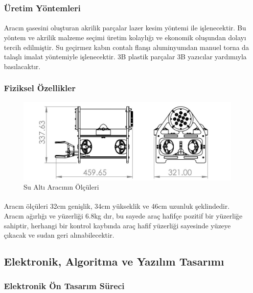 \documentclass[12pt]{article}
\begin{document}
\subsubsection{Üretim Yöntemleri}


\paragraph{} Aracın şasesini oluşturan akrilik parçalar lazer kesim yöntemi ile işlenecektir. Bu yöntem ve akrilik malzeme seçimi üretim kolaylığı ve ekonomik oluşundan dolayı tercih edilmiştir. Su geçirmez kabın contalı flanşı aluminyumdan manuel torna da talaşlı imalat yöntemiyle işlenecektir. 3B plastik parçalar 3B yazıcılar yardımıyla basılacaktır.\newpage

\subsubsection{Fiziksel Özellikler}

\begin{figure}[h]
\centering
\includegraphics[width=1\linewidth]{specs.jpg}
\caption{Su Altı Aracının Ölçüleri}
\end{figure}


\paragraph{} Aracın ölçüleri 32cm genişlik, 34cm yükseklik ve 46cm uzunluk şeklindedir. Aracın ağırlığı ve yüzerliği 6.8kg dır, bu sayede araç hafifçe pozitif bir yüzerliğe sahiptir, herhangi bir kontrol kaybında araç hafif yüzerliği sayesinde yüzeye çıkacak ve sudan geri alınabilecektir. 


\subsection{Elektronik, Algoritma ve Yazılım Tasarımı}

\subsubsection{Elektronik Ön Tasarım Süreci}
\end{document}
